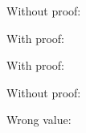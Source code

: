 \documentclass{article}
\theoremstyle{plain}
\begin{document}
Without proof:

With proof:

With proof:

Without proof:

Wrong value:
\end{document}
